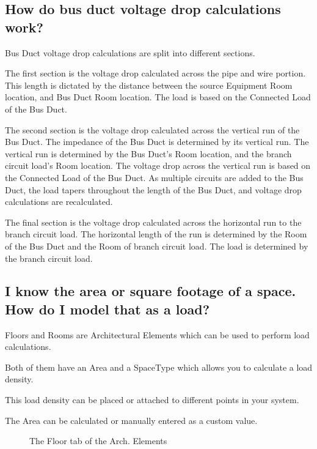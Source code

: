 \documentclass[letterpaper,10pt,english]{sphinxmanual}
\begin{document}
\subsection{How do bus duct voltage drop calculations work?}
\label{\detokenize{docs/faq:how-do-bus-duct-voltage-drop-calculations-work}}\label{\detokenize{docs/faq:bus-duct-calculations}}
Bus Duct voltage drop calculations are split into different sections.

The first section is the voltage drop calculated across the pipe and wire portion.  This length is dictated by the distance between the source Equipment Room location, and Bus Duct Room location.  The load is based on the Connected Load of the Bus Duct.

The second section is the voltage drop calculated across the vertical run of the Bus Duct.  The impedance of the Bus Duct is determined by its vertical run.  The vertical run is determined by the Bus Duct’s Room location, and the branch circuit load’s Room location.  The voltage drop across the vertical run is based on the Connected Load of the Bus Duct.  As multiple circuits are added to the Bus Duct, the load tapers throughout the length of the Bus Duct, and voltage drop calculations are recalculated.

The final section is the voltage drop calculated across the horizontal run to the branch circuit load.  The horizontal length of the run is determined by the Room of the Bus Duct and the Room of branch circuit load.  The load is determined by the branch circuit load.


\subsection{I know the area or square footage of a space.  How do I model that as a load?}
\label{\detokenize{docs/faq:i-know-the-area-or-square-footage-of-a-space-how-do-i-model-that-as-a-load}}\label{\detokenize{docs/faq:arch-power-density}}\label{\detokenize{docs/faq:residential-calculations}}
Floors and Rooms are Architectural Elements which can be used to perform load calculations.

Both of them have an Area and a SpaceType which allows you to calculate a load density.

This load density can be placed or attached to different points in your system.

The Area can be calculated or manually entered as a custom value.

\begin{figure}[H]
\centering
\capstart

\noindent{}
\caption{The Floor tab of the Arch. Elements}\label{\detokenize{docs/faq:id7}}\end{figure}
\end{document}
